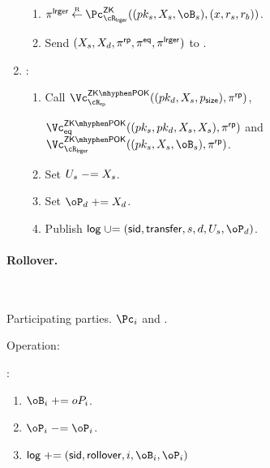 \begin{protocol}
\begin{enumerate}
\begin{enumerate}
			
			\item $\pi^\Lrgs \getsr \pZK{\rLrg}((pk_s,X_s,\oB_s),(x,r_s,r_b))$.
			
			
			\item Send $(X_s,X_d,\pi^{\sf rp},\pi^{\sf eq},\pi^{\sf lrger})$ to \Cc.
		\end{enumerate}
		
		
		\item  \Cc: 
		
		\begin{enumerate}
			\item  Call $\vZKPOK{\rRP}((pk_d,X_s,\psize),\pi^\RPs)$,
			
			 $\vZKPOK{\Eqs}((pk_s,pk_d,X_s,X_s),\pi^\RPs)$ and $\vZKPOK{\rLrg}((pk_s,X_s,\oB_s),\pi^\RPs)$.
			
		
		     \item  Set $U_s \mathrel{-}= X_s$. 
              
              \item  Set $\oP_d \pluseq X_d$. 
              
              		     
		     \item Publish  $\historylog \unioneq (\sid,\transfer,s,d,U_s,\oP_d)$.
		     
		\end{enumerate}
		
	\end{enumerate}
	
\end{protocol}



\paragraph{Rollover.}

\begin{protocol}~\label{prot:ConfidentialTransactions:Rollover}
	\item[Participating parties.] $\Pc_i$ and \Cc.
	
\item[Operation:] ~
	
	\Cc:
	
	\begin{enumerate}
	
	\item $\oB_i  \pluseq \\oP_i$.
	
	
	\item  $\oP_i \minuseq \oP_i$.
	
	\item  $\historylog \pluseq (\sid,\rollover,i,\oB_i,\oP_i)$
	
	
\end{enumerate}
	
\end{protocol}


